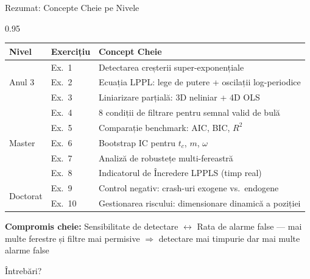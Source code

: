 \documentclass[9pt, aspectratio=169, t]{beamer}
\begin{document}
\begin{frame}{Rezumat: Concepte Cheie pe Nivele}
    \begin{cminipage}{0.95\textwidth}
    {\footnotesize
    \begin{center}
    \begin{tabular}{lll}
        \toprule
        \textbf{Nivel} & \textbf{Exercițiu} & \textbf{Concept Cheie} \\
        \midrule
        \multirow{3}{*}{Anul 3} & Ex.\ 1 & Detectarea creșterii super-exponențiale \\
        & Ex.\ 2 & Ecuația LPPL: lege de putere + oscilații log-periodice \\
        & Ex.\ 3 & Liniarizare parțială: 3D neliniar + 4D OLS \\
        \midrule
        \multirow{5}{*}{Master} & Ex.\ 4 & 8 condiții de filtrare pentru semnal valid de bulă \\
        & Ex.\ 5 & Comparație benchmark: AIC, BIC, $R^2$ \\
        & Ex.\ 6 & Bootstrap IC pentru $t_c$, $m$, $\omega$ \\
        & Ex.\ 7 & Analiză de robustețe multi-fereastră \\
        & Ex.\ 8 & Indicatorul de Încredere LPPLS (timp real) \\
        \midrule
        \multirow{2}{*}{Doctorat} & Ex.\ 9 & Control negativ: crash-uri exogene vs.\ endogene \\
        & Ex.\ 10 & Gestionarea riscului: dimensionare dinamică a poziției \\
        \bottomrule
    \end{tabular}
    \end{center}

    \vspace{3mm}

    {\small \textbf{Compromis cheie:} Sensibilitate de detectare $\longleftrightarrow$ Rata de alarme false --- mai multe ferestre și filtre mai permisive $\Rightarrow$ detectare mai timpurie dar mai multe alarme false}
    }

    \vspace{0.2cm}
    \begin{center}
        \Large\textcolor{MainBlue}{Întrebări?}
    \end{center}
    \end{cminipage}
\end{frame}

\end{document}
